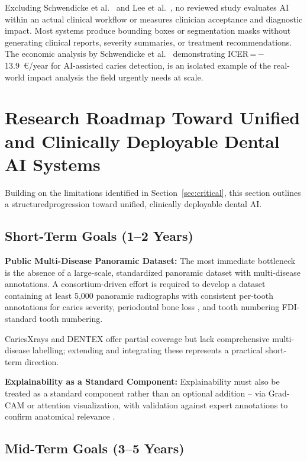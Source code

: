 \documentclass[conference]{IEEEtran}
\begin{document}
Excluding Schwendicke et al.~\cite{schwendicke2021cost} and
Lee et al.~\cite{lee2025evaluation}, no reviewed study evaluates AI
within an actual clinical workflow or measures clinician acceptance and
diagnostic impact.  Most systems produce bounding boxes or segmentation masks without generating clinical reports, severity summaries, or treatment recommendations. The economic analysis by 
Schwendicke et al.~\cite{schwendicke2021cost} demonstrating
ICER\,=\,$-$13.9~\euro/year for AI-assisted caries detection, is an isolated example of the real-world impact analysis the field urgently needs at scale.

\section{Research Roadmap Toward Unified and Clinically Deployable
Dental AI Systems}
\label{sec:roadmap}

Building on the limitations identified in Section~\ref{sec:critical},
this section outlines a structuredprogression toward unified, clinically deployable dental AI.

\subsection{Short-Term Goals (1--2 Years)}

\textbf{Public Multi-Disease Panoramic Dataset:} The most immediate bottleneck is the absence of a large-scale, standardized panoramic dataset with multi-disease annotations. A consortium-driven effort is required to develop a dataset containing at least 5,000 panoramic radiographs with consistent per-tooth annotations for caries severity, periodontal bone loss , and tooth numbering FDI-standard tooth numbering.

 CariesXrays \cite{chen2024cariesxrays} and
DENTEX \cite{nassiri2025yolo} offer partial coverage but lack comprehensive multi-disease labelling; extending and integrating these  represents a practical short-term direction.

\textbf{Explainability as a Standard Component:} Explainability must also be treated as a standard component rather than an optional addition -- via Grad-CAM or attention visualization, with validation against expert annotations to confirm anatomical relevance
\cite{kaushik2025densenet201,bilal2024pdcnet}.

\subsection{Mid-Term Goals (3--5 Years)}
\end{document}
